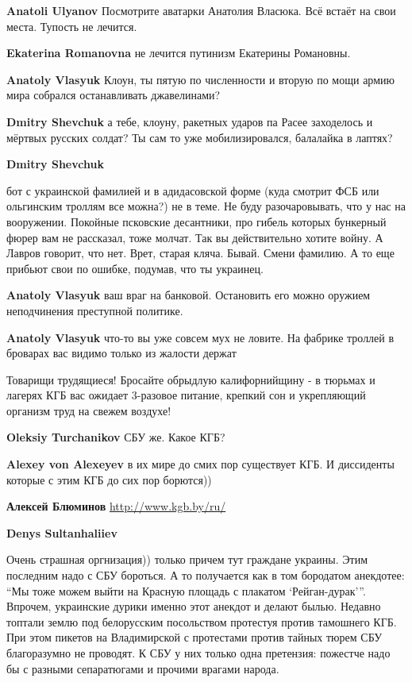 \begin{itemize}
\begin{itemize}
\textbf{Anatoli Ulyanov} Посмотрите аватарки Анатолия Власюка. Всё встаёт на свои места. Тупость не лечится.

\textbf{Ekaterina Romanovna} не лечится путинизм Екатерины Романовны.

\textbf{Anatoly Vlasyuk} Клоун, ты пятую по численности и вторую по мощи армию мира собрался останавливать джавелинами?

\textbf{Dmitry Shevchuk} а тебе, клоуну, ракетных ударов па Расее заходелось и мёртвых русских солдат? Ты сам то уже мобилизировался, балалайка в лаптях?

\textbf{Dmitry Shevchuk} 

бот с украинской фамилией и в адидасовской форме (куда смотрит ФСБ или
ольгинским троллям все можна?) не в теме. Не буду разочаровывать, что у нас на
вооружении. Покойные псковские десантники, про гибель которых бункерный фюрер
вам не рассказал, тоже молчат. Так вы действительно хотите войну. А Лавров
говорит, что нет. Врет, старая кляча. Бывай. Смени фамилию. А то еще прибьют
свои по ошибке, подумав, что ты украинец.

\textbf{Anatoly Vlasyuk} ваш враг на банковой. Остановить его можно оружием неподчинения преступной политике.

\textbf{Anatoly Vlasyuk} что-то вы уже совсем мух не ловите. На фабрике троллей в броварах вас видимо только из жалости держат
\end{itemize} %


Товарищи трудящиеся! Бросайте обрыдлую калифорнийщину - в тюрьмах и лагерях КГБ
вас ожидает 3-разовое питание, крепкий сон и укрепляющий организм труд на
свежем воздухе!

\begin{itemize} %
\textbf{Oleksiy Turchanikov} СБУ же. Какое КГБ?

\textbf{Alexey von Alexeyev} в их мире до смих пор существует КГБ. И диссиденты которые с этим КГБ до сих пор борются))

\textbf{Алексей Блюминов} \url{http://www.kgb.by/ru/}

\textbf{Denys Sultanhaliiev} 

Очень страшная оргнизация)) только причем тут граждане украины. Этим последним
надо с СБУ бороться. А то получается как в том бородатом анекдотее: \enquote{Мы тоже
можем выйти на Красную площадь с плакатом \enquote{Рейган-дурак}}. Впрочем, украинские
дурики именно этот анекдот и делают былью. Недавно топтали землю под
белорусским посольством протестуя против тамошнего КГБ. При этом пикетов на
Владимирской с протестами против тайных тюрем СБУ благоразумно не проводят. К
СБУ у них только одна претензия: пожестче надо бы с разными сепаратюгами и
прочими врагами народа.


\end{itemize}
\end{itemize}
